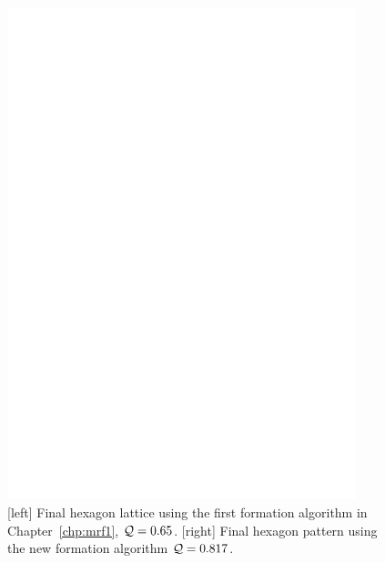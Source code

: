 \begin{figure}
\begin{minipage}{0.45\linewidth}
            \includegraphics[width=0.9\textwidth]{figs/hex40_new}
        \end{minipage}
        \caption{[left] Final hexagon lattice using the first formation algorithm in Chapter~\ref{chp:mrf1}, $\mathcal{Q}=0.65$. [right] Final hexagon pattern using the new formation algorithm $\mathcal{Q}=0.817$.}
        \label{fig:forty_hex_comp}
    \end{figure}
